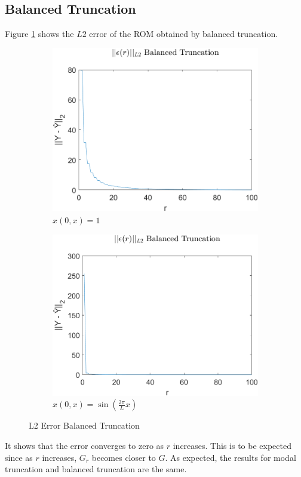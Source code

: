 \subsection{Balanced Truncation}
Figure \ref{FIG-ERR-BT} shows the \(L2\) error of the ROM obtained by balanced truncation.
\begin{figure}[H]
\begin{subfigure}[b]{0.5\textwidth}
\centering
\includegraphics[width=\textwidth]{images/L2_BT}
\caption{$x(0, x) = 1$}
\label{FIG-ERR-BT}
\end{subfigure}
\begin{subfigure}[b]{0.5\textwidth}
\centering
\includegraphics[width=\textwidth]{images/L2_BT_SIN}
\caption{$x(0, x) = \sin(\frac{2\pi}{L}x)$}
\label{FIG-ERR-BT-SIN}
\end{subfigure}
\caption{L2 Error Balanced Truncation}
\end{figure}
It shows that the error converges to zero as \(r\) increases.
This is to be expected since as \(r\) increases, \(G_r\) becomes closer to \(G\).
As expected, the results for modal truncation and balanced truncation are the same.

